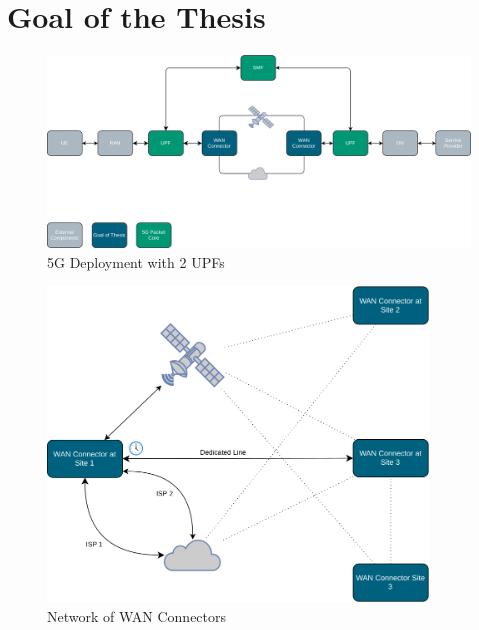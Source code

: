 
\section{Goal of the Thesis}
\label{sec:goal}

\begin{figure}[h]
    \centering
        \includegraphics[width=\textwidth]{fig/telco-use-case-2.png}
        \caption{5G Deployment with 2 UPFs}
        \label{fig:telco}
\end{figure}


\begin{figure}[h]
    \centering
        \includegraphics[width=0.9\textwidth, height=0.75\textwidth]{fig/mesh_network.png}
        \caption{Network of WAN Connectors}
        \label{fig:mesh}
\end{figure}

